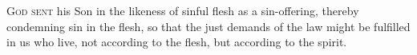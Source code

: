 
\lettrine{G}{od sent} his Son in the likeness of sinful flesh as a
sin-offering, thereby condemning sin in the flesh, so that the just
demands of the law might be fulfilled in us who live, not according
to the flesh, but according to the spirit.

